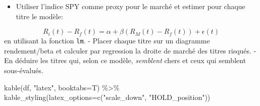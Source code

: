 \documentclass[
]{article}
\newenvironment{Shaded}{\begin{snugshade}}{\end{snugshade}}
\newcommand{\AttributeTok}[1]{\textcolor[rgb]{0.77,0.63,0.00}{#1}}
\newcommand{\ControlFlowTok}[1]{\textcolor[rgb]{0.13,0.29,0.53}{\textbf{#1}}}
\newcommand{\DecValTok}[1]{\textcolor[rgb]{0.00,0.00,0.81}{#1}}
\newcommand{\FloatTok}[1]{\textcolor[rgb]{0.00,0.00,0.81}{#1}}
\newcommand{\FunctionTok}[1]{\textcolor[rgb]{0.00,0.00,0.00}{#1}}
\newcommand{\NormalTok}[1]{#1}
\newcommand{\OtherTok}[1]{\textcolor[rgb]{0.56,0.35,0.01}{#1}}
\newcommand{\SpecialCharTok}[1]{\textcolor[rgb]{0.00,0.00,0.00}{#1}}
\newcommand{\StringTok}[1]{\textcolor[rgb]{0.31,0.60,0.02}{#1}}
\providecommand{\tightlist}{%
  \setlength{\itemsep}{0pt}\setlength{\parskip}{0pt}}
\begin{document}
\begin{itemize}
\tightlist
\item
  Utiliser l'indice SPY comme proxy pour le marché et estimer pour
  chaque titre le modèle:
\end{itemize}

\[
R_i(t) - R_f(t) = \alpha + \beta (R_M(t) - R_f(t)) + \epsilon(t)
\] en utilisant la fonction \texttt{lm}. - Placer chaque titre sur un
diagramme rendement/beta et calculer par regression la droite de marché
des titres risqués. - En déduire les titres qui, selon ce modèle,
\emph{semblent} chers et ceux qui semblent sous-évalués.

\begin{Shaded}
\end{Shaded}

\begin{Shaded}
\begin{Highlighting}[]
\FunctionTok{kable}\NormalTok{(df, }\StringTok{"latex"}\NormalTok{, }\AttributeTok{booktabs=}\NormalTok{T) }\SpecialCharTok{\%\textgreater{}\%}
\FunctionTok{kable\_styling}\NormalTok{(}\AttributeTok{latex\_options=}\FunctionTok{c}\NormalTok{(}\StringTok{"scale\_down"}\NormalTok{, }\StringTok{"HOLD\_position"}\NormalTok{))}
\end{Highlighting}
\end{Shaded}
\end{document}
